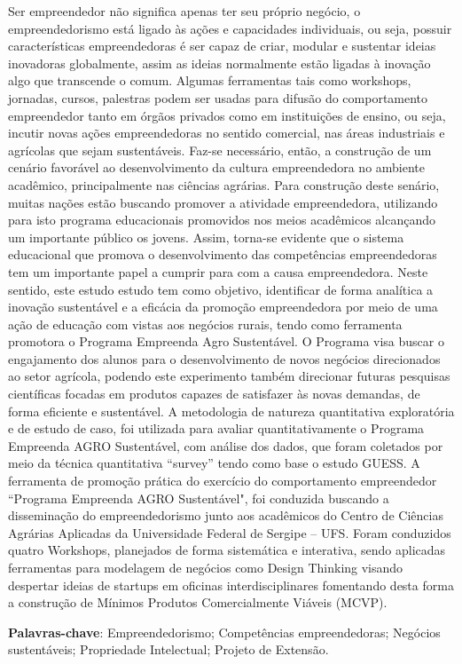 \setlength{\absparsep}{18pt} %
\begin{resumo}


Ser empreendedor não significa apenas ter seu próprio negócio, o empreendedorismo está ligado às ações e capacidades individuais, ou seja, possuir características empreendedoras é ser capaz de criar, modular e sustentar ideias inovadoras globalmente, assim as ideias normalmente estão ligadas à inovação algo que transcende o comum. Algumas ferramentas tais como workshops, jornadas, cursos, palestras podem ser usadas para difusão do comportamento empreendedor tanto em órgãos privados como em instituições de ensino, ou seja, incutir novas ações empreendedoras no sentido comercial, nas áreas industriais e agrícolas que sejam sustentáveis. Faz-se necessário, então, a construção de um cenário favorável ao desenvolvimento da cultura empreendedora no ambiente acadêmico, principalmente nas ciências agrárias. Para construção deste senário, muitas nações estão buscando promover a atividade empreendedora, utilizando para isto programa educacionais promovidos nos meios acadêmicos alcançando um importante público os jovens. Assim, torna-se evidente que o sistema educacional que promova o desenvolvimento das competências empreendedoras tem um importante papel a cumprir para com a causa empreendedora. Neste sentido, este estudo estudo tem como objetivo, identificar de forma analítica a inovação sustentável e a eficácia da promoção empreendedora por meio de uma ação de educação com vistas aos negócios rurais, tendo como ferramenta promotora o Programa Empreenda Agro Sustentável. O Programa visa buscar o engajamento dos alunos para o desenvolvimento de novos negócios direcionados ao setor agrícola, podendo este experimento também direcionar futuras pesquisas científicas focadas em produtos capazes de satisfazer às novas demandas, de forma eficiente e sustentável. A metodologia de natureza quantitativa exploratória e de estudo de caso, foi utilizada para avaliar quantitativamente o Programa Empreenda AGRO Sustentável, com análise dos dados, que foram coletados por meio da técnica quantitativa “survey” tendo como base o estudo GUESS. A ferramenta de promoção prática do exercício do comportamento empreendedor “Programa Empreenda AGRO Sustentável", foi conduzida buscando a disseminação do empreendedorismo junto aos acadêmicos do Centro de Ciências Agrárias Aplicadas da Universidade Federal de Sergipe – UFS. Foram conduzidos quatro Workshops, planejados de forma sistemática e interativa, sendo aplicadas ferramentas para modelagem de negócios como Design Thinking visando despertar ideias de startups em oficinas interdisciplinares fomentando desta forma a construção de Mínimos Produtos Comercialmente Viáveis (MCVP).

\textbf{Palavras-chave}: Empreendedorismo; Competências empreendedoras; Negócios sustentáveis; Propriedade Intelectual; Projeto de Extensão.
\end{resumo}